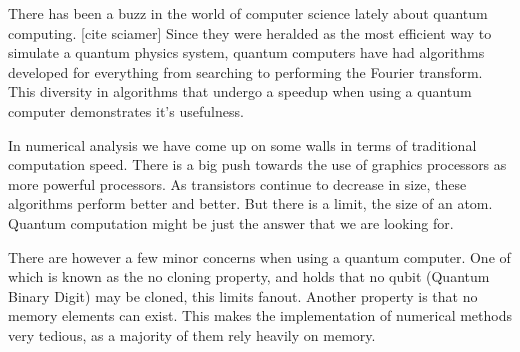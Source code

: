 
There has been a buzz in the world of computer science lately about quantum computing. [cite sciamer]
Since they were heralded as the most efficient way to simulate a quantum physics system, quantum computers have had algorithms developed for everything from searching to performing the Fourier transform. 
This diversity in algorithms that undergo a speedup when using a quantum computer demonstrates it's usefulness. 


In numerical analysis we have come up on some walls in terms of traditional computation speed. 
There is a big push towards the use of graphics processors as more powerful processors. 
As transistors continue to decrease in size, these algorithms perform better and better. 
But there is a limit, the size of an atom. 
Quantum computation might be just the answer that we are looking for. 


There are however a few minor concerns when using a quantum computer. 
One of which is known as the no cloning property, and holds that no qubit (Quantum Binary Digit) may be cloned, this limits fanout. 
Another property is that no memory elements can exist. 
This makes the implementation of numerical methods very tedious, as a majority of them rely heavily on memory.


